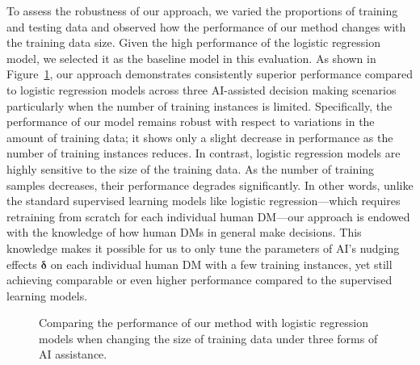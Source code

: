 \documentclass[letterpaper]{article} %
\begin{document}
To assess the robustness of our approach, we varied the proportions of training and testing data and observed how the performance of our method changes with the training data size. %
Given the high performance of the logistic regression model,
we selected it as the baseline model in this evaluation. As shown in Figure~\ref{fig:performance2}, our approach demonstrates consistently superior performance compared to logistic regression models across three AI-assisted decision making scenarios particularly when the number of training instances is limited. %
Specifically, the performance of our model remains robust with respect to variations in the amount of training data; it shows only a slight decrease in performance as the number of training instances reduces. In contrast, logistic regression models are highly sensitive to the size of the training data. As the number of training samples decreases, their performance degrades significantly. In other words, unlike the standard supervised learning models like logistic regression---which requires retraining from scratch for each individual human DM---our approach is endowed with the knowledge of how human DMs in general make decisions.
This knowledge makes it possible for us to only tune the parameters of AI's nudging effects $\bm{\delta}$ on each individual human DM with a few training instances, yet still achieving comparable or even higher performance compared to the supervised learning models.
\begin{figure}[t]
    \centering
    \hfill
    \caption{Comparing the performance of our method with logistic regression models when changing the size of training data under three forms of AI assistance. }
    \label{fig:performance2}
\end{figure}
\end{document}
